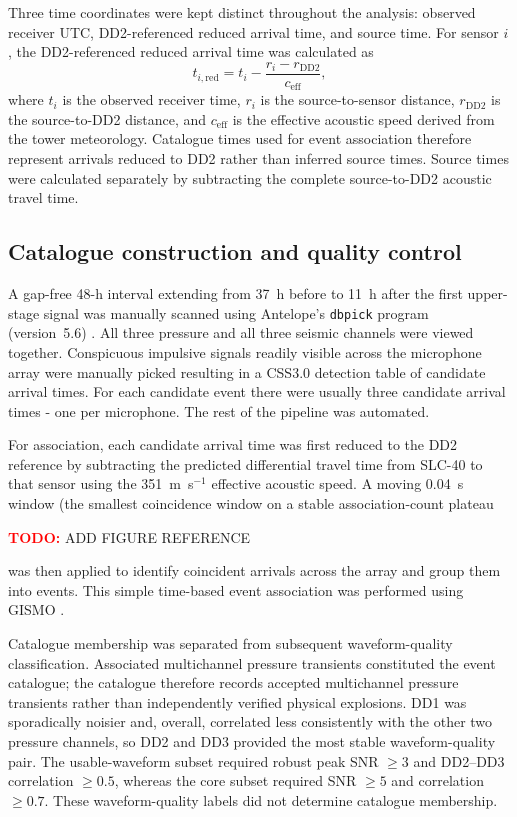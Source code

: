 \documentclass[]{seismica}
\newcommand{\todo}[1]{%
  \par\noindent
  \colorbox{yellow!40}{%
    \parbox{0.96\linewidth}{%
      \textbf{\textcolor{red}{TODO:}} #1
    }%
  }%
  \par
}
\begin{document}
Three time coordinates were kept distinct throughout the analysis: observed
receiver UTC, DD2-referenced reduced arrival time, and source time. For sensor
$i$, the DD2-referenced reduced arrival time was calculated as
\begin{equation}
 t_{i,\mathrm{red}}=t_i-\frac{r_i-r_{\mathrm{DD2}}}{c_{\mathrm{eff}}},
 \label{eq:reduced_time}
\end{equation}
where $t_i$ is the observed receiver time, $r_i$ is the source-to-sensor
distance, $r_{\mathrm{DD2}}$ is the source-to-DD2 distance, and
$c_{\mathrm{eff}}$ is the effective acoustic speed derived from the tower
meteorology. Catalogue times used for event association therefore represent
arrivals reduced to DD2 rather than inferred source times. Source times were
calculated separately by subtracting the complete source-to-DD2 acoustic
travel time.

\subsection{Catalogue construction and quality control}

A gap-free 48-h interval extending from 37~h before to 11~h after the first
upper-stage signal was manually scanned using
Antelope's \texttt{dbpick} program (version~5.6) \citep{brtt_antelope}. All three pressure and all three seismic
channels were viewed together. Conspicuous impulsive signals readily
visible across the microphone array were manually picked resulting in a CSS3.0 detection table of candidate arrival times.
For each candidate event there were usually three candidate arrival times - one per microphone. The rest of the pipeline was automated. 

For association, each candidate arrival time was first reduced to the DD2 reference by
subtracting the predicted differential travel time from SLC-40 to that sensor
using the 351~m~s$^{-1}$ effective acoustic speed. A moving 0.04~s window (the smallest coincidence
window on a stable association-count plateau \todo{ADD FIGURE REFERENCE} was then applied to identify coincident 
arrivals across the array and group them into events. This simple time-based event association was performed 
using GISMO \citep{thompson_gismo_2017}. 

Catalogue membership was separated from subsequent waveform-quality
classification. Associated multichannel pressure transients constituted the
event catalogue; the catalogue therefore records accepted multichannel
pressure transients rather than independently verified physical explosions.
DD1 was sporadically noisier and, overall, correlated less consistently with
the other two pressure channels, so DD2 and DD3 provided the most stable
waveform-quality pair. The usable-waveform subset required robust peak
SNR $\geq3$ and DD2--DD3 correlation $\geq0.5$, whereas the core subset
required SNR $\geq5$ and correlation $\geq0.7$. These waveform-quality labels
did not determine catalogue membership.
\end{document}
